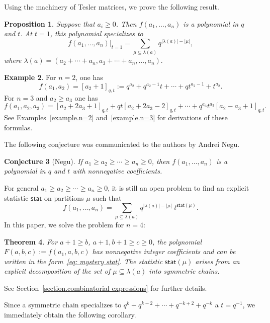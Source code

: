 \documentclass[11pt,reqno]{amsart}
\newcommand{\stat}{\mathsf{stat}}
\newtheorem{theorem}{Theorem}[section]
\newtheorem{conjecture}[theorem]{Conjecture}
\newtheorem{proposition}[theorem]{Proposition}
\theoremstyle{definition}
\newtheorem{example}[theorem]{Example}
\numberwithin{equation}{section}
\begin{document}
Using the machinery of Tesler matrices, we  prove the following result.
\begin{proposition}
Suppose that $a_i\geqslant 0$. Then $f(a_1,\ldots,a_n)$ is a polynomial in $q$ and $t$.
At $t=1$, this polynomial specializes to 
\[
	f(a_1,\ldots,a_n) \Big|_{t=1} 
	=\sum_{\mu\subseteq \lambda(a)}q^{|\lambda(a)|-|\mu|},
\]
where $\lambda(a)=(a_2+\cdots+a_n,a_3+\cdots+a_n,\ldots,a_n).$
\end{proposition}

\begin{example}
\label{example.2 and 3}
For $n=2$, one has 
\[
	f(a_1,a_2)=[a_2+1]_{q,t}:=q^{a_2}+q^{a_2-1}t+\cdots+qt^{a_2-1}+t^{a_2}.
\]
For $n=3$ and $a_2\geqslant a_3$ one has
\[
	f(a_1,a_2,a_3)=[a_2+2a_3+1]_{q,t}+qt[a_2+2a_3-2]_{q,t}+\cdots+q^{a_3}t^{a_3}[a_2-a_3+1]_{q,t}.
\]
See Examples~\ref{example.n=2} and~\ref{example.n=3} for derivations of these formulas.
\end{example}

The following conjecture was communicated to the authors by Andrei Negu.
 

\begin{conjecture}[Negu]
\label{conj:positivity}
If $a_1\geqslant a_2 \geqslant \cdots\geqslant a_n\geqslant 0$, then $f(a_1,\ldots,a_n)$ is a polynomial in $q$ and $t$ 
with nonnegative coefficients.
\end{conjecture}

For general $a_1\geqslant a_2 \geqslant \cdots\geqslant a_n\geqslant 0$, it is still an open problem to find an explicit 
statistic $\stat$ on partitions $\mu$ such that
\begin{equation}
\label{eq: mystery stat}
	f(a_1,\ldots,a_n)=\sum_{\mu\subseteq \lambda(a)}q^{|\lambda(a)|-|\mu|}\; t^{\stat(\mu)}.
\end{equation}
In this paper, we solve the problem for $n=4$:

\begin{theorem}
For $a+1 \geqslant b$, $a+1,b+1 \geqslant c\geqslant 0$, the polynomial $F(a,b,c) := f(a_1,a,b,c)$ has nonnegative 
integer coefficients and can be written in the form~\eqref{eq: mystery stat}. 
The statistic $\stat(\mu)$ arises from an explicit decomposition of the set of $\mu\subseteq \lambda(a)$
into symmetric chains. 
\end{theorem}
See Section~\ref{section.combinatorial expressions} for further details.

Since a symmetric chain specializes to $q^{k}+q^{k-2}+\cdots+q^{-k+2}+q^{-k}$ a $t=q^{-1}$, we immediately obtain the 
following corollary.
\end{document}
